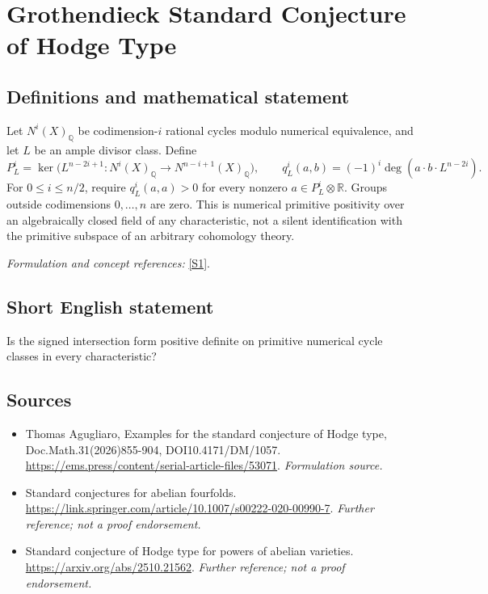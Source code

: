 \documentclass[11pt]{article}
\begin{document}
\section*{\texorpdfstring{Grothendieck Standard Conjecture of Hodge Type}{Grothendieck Standard Conjecture of Hodge Type}}\label{88}
\subsection{Definitions and mathematical statement}
Let $N^i(X)_{{\mathbb{Q}}}$ be codimension-$i$ rational cycles modulo numerical equivalence, and let $L$ be an ample divisor class. Define
\[
 P_L^i=\ker\bigl(L^{n-2i+1}:N^i(X)_{{\mathbb{Q}}}\to N^{n-i+1}(X)_{{\mathbb{Q}}}\bigr),
 \qquad q_L^i(a,b)=(-1)^i\deg(a\cdot b\cdot L^{n-2i}).
\]
For $0\le i\le n/2$, require $q_L^i(a,a)>0$ for every nonzero $a\in P_L^i\otimes{\mathbb{R}}$. Groups outside codimensions $0,\ldots,n$ are zero. This is numerical primitive positivity over an algebraically closed field of any characteristic, not a silent identification with the primitive subspace of an arbitrary cohomology theory.
\par\smallskip\textit{Formulation and concept references:} \href{https://ems.press/content/serial-article-files/53071}{[S1]}.

\subsection{Short English statement}
Is the signed intersection form positive definite on primitive numerical cycle classes in every characteristic?
\subsection{Sources}
\begin{itemize}
\item[S1]Thomas Agugliaro, Examples for the standard conjecture of Hodge type, Doc.Math.31(2026)855-904, DOI10.4171/DM/1057.
\url{https://ems.press/content/serial-article-files/53071}.
\textit{Formulation source.}
\item[S2]Standard conjectures for abelian fourfolds.
\url{https://link.springer.com/article/10.1007/s00222-020-00990-7}.
\textit{Further reference; not a proof endorsement.}
\item[S3]Standard conjecture of Hodge type for powers of abelian varieties.
\url{https://arxiv.org/abs/2510.21562}.
\textit{Further reference; not a proof endorsement.}
\end{itemize}
\end{document}
